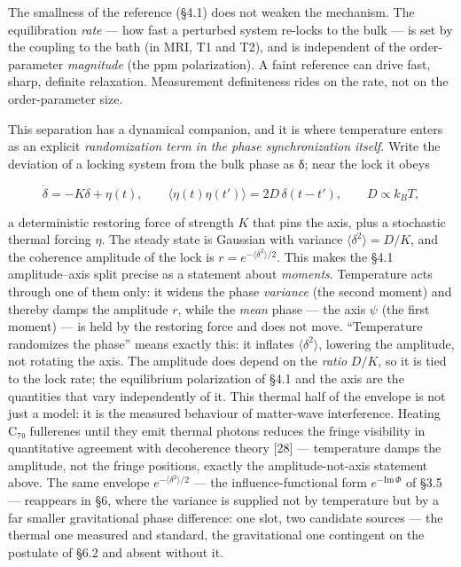 \documentclass[
]{article}
\begin{document}
The smallness of the reference (§4.1) does not weaken the mechanism. The
equilibration \emph{rate} --- how fast a perturbed system re-locks to
the bulk --- is set by the coupling to the bath (in MRI, T1 and T2), and
is independent of the order-parameter \emph{magnitude} (the ppm
polarization). A faint reference can drive fast, sharp, definite
relaxation. Measurement definiteness rides on the rate, not on the
order-parameter size.

This separation has a dynamical companion, and it is where temperature
enters as an explicit \emph{randomization term in the phase
synchronization itself.} Write the deviation of a locking system from
the bulk phase as δ; near the lock it obeys

\[\dot\delta = -K\delta + \eta(t), \qquad \langle\eta(t)\eta(t')\rangle = 2D\,\delta(t-t'), \qquad D \propto k_BT,\]

a deterministic restoring force of strength \(K\) that pins the axis,
plus a stochastic thermal forcing \(\eta\). The steady state is Gaussian
with variance \(\langle\delta^2\rangle = D/K\), and the coherence
amplitude of the lock is \(r = e^{-\langle\delta^2\rangle/2}\). This
makes the §4.1 amplitude--axis split precise as a statement about
\emph{moments}. Temperature acts through one of them only: it widens the
phase \emph{variance} (the second moment) and thereby damps the
amplitude \(r\), while the \emph{mean} phase --- the axis \(\psi\) (the
first moment) --- is held by the restoring force and does not move.
``Temperature randomizes the phase'' means exactly this: it inflates
\(\langle\delta^2\rangle\), lowering the amplitude, not rotating the
axis. The amplitude does depend on the \emph{ratio} \(D/K\), so it is
tied to the lock rate; the equilibrium polarization of §4.1 and the axis
are the quantities that vary independently of it. This thermal half of
the envelope is not just a model: it is the measured behaviour of
matter-wave interference. Heating C₇₀ fullerenes until they emit thermal
photons reduces the fringe visibility in quantitative agreement with
decoherence theory {[}28{]} --- temperature damps the amplitude, not the
fringe positions, exactly the amplitude-not-axis statement above. The
same envelope \(e^{-\langle\delta^2\rangle/2}\) --- the
influence-functional form \(e^{-\mathrm{Im}\,\Phi}\) of §3.5 ---
reappears in §6, where the variance is supplied not by temperature but
by a far smaller gravitational phase difference: one slot, two candidate
sources --- the thermal one measured and standard, the gravitational one
contingent on the postulate of §6.2 and absent without it.
\end{document}
